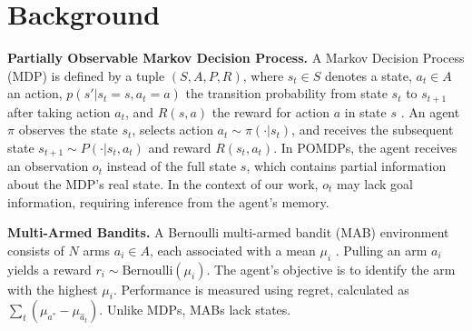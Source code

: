 \section{Background}
\label{appendix:background}
\textbf{Partially Observable Markov Decision Process.}
A Markov Decision Process (MDP) is defined by a tuple $(S, A, P, R)$, where $s_t \in S$ denotes a state, $a_t \in A$ an action, $p(s' | s_t = s, a_t = a)$ the transition probability from state $s_t$ to $s_{t+1}$ after taking action $a_t$, and $R(s, a)$ the reward for action $a$ in state $s$ \citep{sutton2018reinforcement}. An agent $\pi$ observes the state $s_t$, selects action $a_t \sim \pi(\cdot|s_t)$, and receives the subsequent state $s_{t+1} \sim P(\cdot | s_t, a_t)$ and reward $R(s_t, a_t)$. In POMDPs, the agent receives an observation $o_t$ instead of the full state $s$, which contains partial information about the MDP's real state. In the context of our work, $o_t$ may lack goal information, requiring inference from the agent's memory.

\textbf{Multi-Armed Bandits.}
A Bernoulli multi-armed bandit (MAB) environment consists of $N$ arms $a_i \in A$, each associated with a mean $\mu_i$ \citep{sutton2018reinforcement}. Pulling an arm $a_i$ yields a reward $r_i \sim \text{Bernoulli}(\mu_i)$. The agent's objective is to identify the arm with the highest $\mu_i$. Performance is measured using regret, calculated as $\sum_t(\mu_{a^*} - \mu_{\hat{a}_t})$. Unlike MDPs, MABs lack states. 

